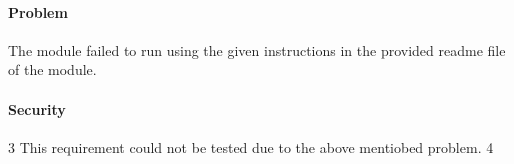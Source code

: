 
\paragraph{Problem }
The module failed to run using the given instructions in the provided readme file of the module.
\paragraph{Security} 
3 	This requirement could not be tested due to the above mentiobed problem.  
4 	
